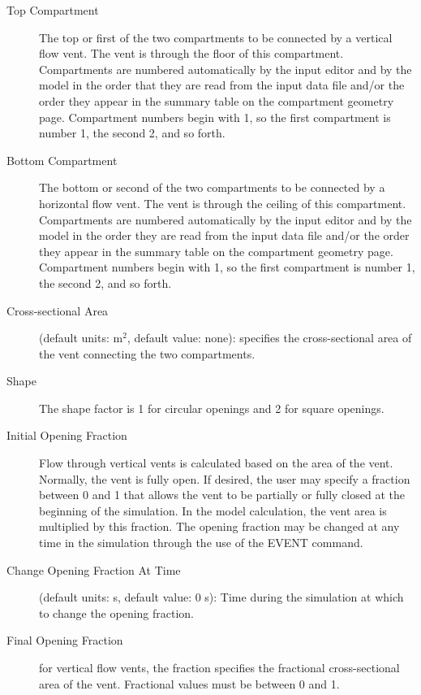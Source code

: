 \begin{description}
\item[Top Compartment] The top or first of the two compartments to be connected by a vertical flow vent. The vent is through the floor of this compartment.  Compartments are numbered automatically by the input editor and by the model in the order that they are read from the input data file and/or the order they appear in the summary table on the compartment geometry page. Compartment numbers begin with 1, so the first compartment is number 1, the second 2, and so forth.

\item[Bottom Compartment] The bottom or second of the two compartments to be connected by a horizontal flow vent. The vent is through the ceiling of this compartment. Compartments are numbered automatically by the input editor and by the model in the order they are read from the input data file and/or the order they appear in the summary table on the compartment geometry page. Compartment numbers begin with 1, so the first compartment is number 1, the second 2, and so forth.

\item[Cross-sectional Area] (default units: m$^2$, default value: none): specifies the cross-sectional area of the vent connecting the two compartments.

\item[Shape] The shape factor is 1 for circular openings and 2 for square openings.

\item[Initial Opening Fraction] Flow through vertical vents is calculated based on the area of the vent.  Normally, the vent is fully open.  If desired, the user may specify a fraction between 0 and 1 that allows the vent to be partially or fully closed at the beginning of the simulation.  In the model calculation, the vent area is multiplied by this fraction.  The opening fraction may be changed at any time in the simulation through the use of the EVENT command.

\item[Change Opening Fraction At Time] (default units: s, default value: 0 s): Time during the simulation at which to change the opening fraction.

\item[Final Opening Fraction] for vertical flow vents, the fraction specifies the fractional cross-sectional area of the vent. Fractional values must be between 0 and 1.
\end{description}

